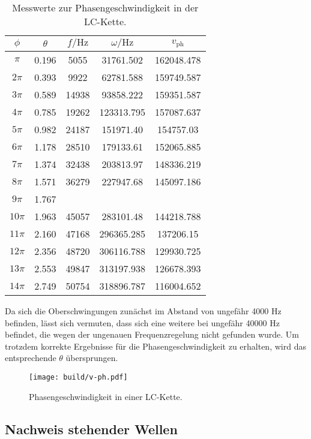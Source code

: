   \begin{table}
    \centering
    \caption{Messwerte zur Phasengeschwindigkeit in der LC-Kette.}
    \label{tab:v-phase}
    \begin{tabular}{c c c c c}
      \toprule
      $\phi$ & $\theta$ & $f / \si{\hertz}$ & $\omega / \si{\hertz}$ & $v_\mathrm{ph}$ \\
      \midrule
$\pi$ & 0.196 & 5055 & 31761.502 & 162048.478 \\
$2\pi$ & 0.393 &  9922 &  62781.588 & 159749.587 \\
$3\pi$ & 0.589 & 14938 & 93858.222 & 159351.587 \\
$4\pi$ & 0.785 & 19262 & 123313.795 & 157087.637 \\
$5\pi$ & 0.982 & 24187 & 151971.40 & 154757.03 \\
$6\pi$ & 1.178 & 28510 & 179133.61 & 152065.885 \\
$7\pi$ & 1.374 & 32438 & 203813.97 & 148336.219 \\
$8\pi$ &  1.571 & 36279 & 227947.68 & 145097.186 \\
$9\pi$ & 1.767  \\
$10\pi$ & 1.963 & 45057 & 283101.48 & 144218.788 \\
$11\pi$ &  2.160 & 47168 & 296365.285 & 137206.15 \\
$12\pi$ & 2.356 & 48720 & 306116.788 & 129930.725 \\
$13\pi$ & 2.553 & 49847 & 313197.938 & 126678.393 \\
$14\pi$ & 2.749 & 50754 & 318896.787 & 116004.652 \\
\bottomrule
\end{tabular}
\end{table}

Da sich die Oberschwingungen zunächst im Abstand von ungefähr 4000 \si{\Hz} befinden, lässt sich vermuten, dass sich eine weitere bei ungefähr 40000 \si{\Hz} befindet, die wegen der ungenauen Frequenzregelung nicht gefunden wurde.
Um trotzdem korrekte Ergebnisse für die Phasengeschwindigkeit zu erhalten, wird das entsprechende $\theta$ übersprungen.

\begin{figure}
  \centering
  \texttt{[image: build/v-ph.pdf]}
\caption{Phasengeschwindigkeit in einer LC-Kette.}
  \label{fig:v-ph}
\end{figure}

\subsection{Nachweis stehender Wellen}

